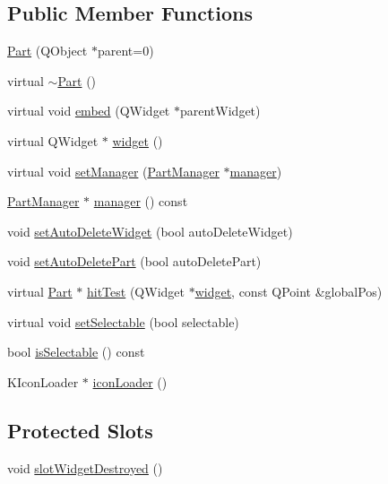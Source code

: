 \subsection*{Public Member Functions}
\begin{DoxyCompactItemize}
\item 
\hyperlink{classKParts_1_1Part_afa61f98b2c9b14cbf94f9b1e2b453597}{Part} (Q\+Object $\ast$parent=0)
\item 
virtual \hyperlink{classKParts_1_1Part_a339e7a12833cdd5d4820d69070ea458b}{$\sim$\+Part} ()
\item 
virtual void \hyperlink{classKParts_1_1Part_afb9d58b0de422a96a809abade83c3922}{embed} (Q\+Widget $\ast$parent\+Widget)
\item 
virtual Q\+Widget $\ast$ \hyperlink{classKParts_1_1Part_a134900cb0605a1cd5113d90954a01fdf}{widget} ()
\item 
virtual void \hyperlink{classKParts_1_1Part_afb87e3aed12cfdd6ecf057f916c7889f}{set\+Manager} (\hyperlink{classKParts_1_1PartManager}{Part\+Manager} $\ast$\hyperlink{classKParts_1_1Part_a06ea4dd249752f23229bc30b693eed44}{manager})
\item 
\hyperlink{classKParts_1_1PartManager}{Part\+Manager} $\ast$ \hyperlink{classKParts_1_1Part_a06ea4dd249752f23229bc30b693eed44}{manager} () const 
\item 
void \hyperlink{classKParts_1_1Part_a18a6e6b02d7d08a52314d5a7a2d0a3bd}{set\+Auto\+Delete\+Widget} (bool auto\+Delete\+Widget)
\item 
void \hyperlink{classKParts_1_1Part_a0af0172fc3b5c585524ca5e84af05017}{set\+Auto\+Delete\+Part} (bool auto\+Delete\+Part)
\item 
virtual \hyperlink{classKParts_1_1Part}{Part} $\ast$ \hyperlink{classKParts_1_1Part_a5398eb6687f7136e2c02ec7f6f5fd66e}{hit\+Test} (Q\+Widget $\ast$\hyperlink{classKParts_1_1Part_a134900cb0605a1cd5113d90954a01fdf}{widget}, const Q\+Point \&global\+Pos)
\item 
virtual void \hyperlink{classKParts_1_1Part_aa4841b2e2ddb43de60e28ede88151f33}{set\+Selectable} (bool selectable)
\item 
bool \hyperlink{classKParts_1_1Part_a6c3e8845a5836a790ab67cb360120cab}{is\+Selectable} () const 
\item 
K\+Icon\+Loader $\ast$ \hyperlink{classKParts_1_1Part_a8c41d16009e44a35ec3b7c5e6b4e0b80}{icon\+Loader} ()
\end{DoxyCompactItemize}
\subsection*{Protected Slots}
\begin{DoxyCompactItemize}
\item 
void \hyperlink{classKParts_1_1Part_a07231742bae75d6fc5712aaf45397b29}{slot\+Widget\+Destroyed} ()
\end{DoxyCompactItemize}
